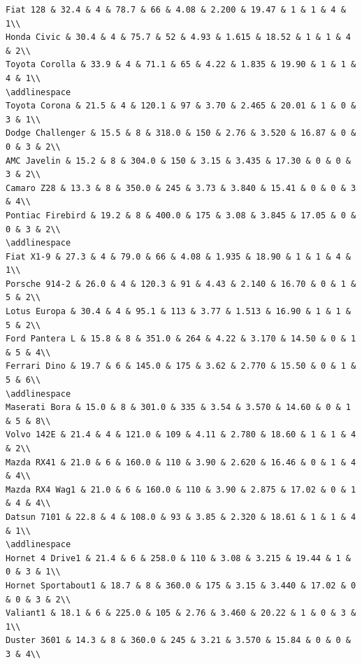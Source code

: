 \documentclass[a4paper, nobind]{templates/ociamthesis}
\begin{document}
\begin{verbatim}
Fiat 128 & 32.4 & 4 & 78.7 & 66 & 4.08 & 2.200 & 19.47 & 1 & 1 & 4 & 1\\
Honda Civic & 30.4 & 4 & 75.7 & 52 & 4.93 & 1.615 & 18.52 & 1 & 1 & 4 & 2\\
Toyota Corolla & 33.9 & 4 & 71.1 & 65 & 4.22 & 1.835 & 19.90 & 1 & 1 & 4 & 1\\
\addlinespace
Toyota Corona & 21.5 & 4 & 120.1 & 97 & 3.70 & 2.465 & 20.01 & 1 & 0 & 3 & 1\\
Dodge Challenger & 15.5 & 8 & 318.0 & 150 & 2.76 & 3.520 & 16.87 & 0 & 0 & 3 & 2\\
AMC Javelin & 15.2 & 8 & 304.0 & 150 & 3.15 & 3.435 & 17.30 & 0 & 0 & 3 & 2\\
Camaro Z28 & 13.3 & 8 & 350.0 & 245 & 3.73 & 3.840 & 15.41 & 0 & 0 & 3 & 4\\
Pontiac Firebird & 19.2 & 8 & 400.0 & 175 & 3.08 & 3.845 & 17.05 & 0 & 0 & 3 & 2\\
\addlinespace
Fiat X1-9 & 27.3 & 4 & 79.0 & 66 & 4.08 & 1.935 & 18.90 & 1 & 1 & 4 & 1\\
Porsche 914-2 & 26.0 & 4 & 120.3 & 91 & 4.43 & 2.140 & 16.70 & 0 & 1 & 5 & 2\\
Lotus Europa & 30.4 & 4 & 95.1 & 113 & 3.77 & 1.513 & 16.90 & 1 & 1 & 5 & 2\\
Ford Pantera L & 15.8 & 8 & 351.0 & 264 & 4.22 & 3.170 & 14.50 & 0 & 1 & 5 & 4\\
Ferrari Dino & 19.7 & 6 & 145.0 & 175 & 3.62 & 2.770 & 15.50 & 0 & 1 & 5 & 6\\
\addlinespace
Maserati Bora & 15.0 & 8 & 301.0 & 335 & 3.54 & 3.570 & 14.60 & 0 & 1 & 5 & 8\\
Volvo 142E & 21.4 & 4 & 121.0 & 109 & 4.11 & 2.780 & 18.60 & 1 & 1 & 4 & 2\\
Mazda RX41 & 21.0 & 6 & 160.0 & 110 & 3.90 & 2.620 & 16.46 & 0 & 1 & 4 & 4\\
Mazda RX4 Wag1 & 21.0 & 6 & 160.0 & 110 & 3.90 & 2.875 & 17.02 & 0 & 1 & 4 & 4\\
Datsun 7101 & 22.8 & 4 & 108.0 & 93 & 3.85 & 2.320 & 18.61 & 1 & 1 & 4 & 1\\
\addlinespace
Hornet 4 Drive1 & 21.4 & 6 & 258.0 & 110 & 3.08 & 3.215 & 19.44 & 1 & 0 & 3 & 1\\
Hornet Sportabout1 & 18.7 & 8 & 360.0 & 175 & 3.15 & 3.440 & 17.02 & 0 & 0 & 3 & 2\\
Valiant1 & 18.1 & 6 & 225.0 & 105 & 2.76 & 3.460 & 20.22 & 1 & 0 & 3 & 1\\
Duster 3601 & 14.3 & 8 & 360.0 & 245 & 3.21 & 3.570 & 15.84 & 0 & 0 & 3 & 4\\

\end{verbatim}
\end{document}
